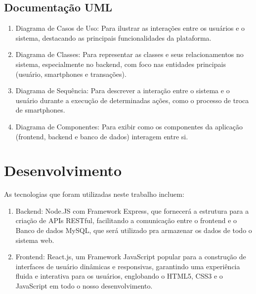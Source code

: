 \subsection{Documentação UML}
    \begin{enumerate}

    \item Diagrama de Casos de Uso: Para ilustrar as interações entre os usuários e o
sistema, destacando as principais funcionalidades da plataforma.
    
    \item Diagrama de Classes: Para representar as classes e seus relacionamentos no
sistema, especialmente no backend, com foco nas entidades principais (usuário,
smartphones e transações).

    \item Diagrama de Sequência: Para descrever a interação entre o sistema e o usuário
durante a execução de determinadas ações, como o processo de troca de
smartphones.
    
    \item Diagrama de Componentes: Para exibir como os componentes da aplicação
(frontend, backend e banco de dados) interagem entre si.
    
    \end{enumerate}

\section{Desenvolvimento}
As tecnologias que foram utilizadas neste trabalho incluem:
\begin{enumerate}
    \item Backend: Node.JS com Framework Express, que fornecerá a estrutura para a criação de
    APIs RESTful, facilitando a comunicação entre o frontend e o Banco de dados MySQL, que será utilizado pra 
    armazenar os dados de todo o sistema web.
    \item Frontend: React.js, um Framework JavaScript popular para a construção de
    interfaces de usuário dinâmicas e responsivas, garantindo uma experiência fluida e
    interativa para os usuários, englobando o HTML5, CSS3 e o JavaScript em todo o nosso desenvolvimento.
\end{enumerate}


\label{chap:Metodologia}